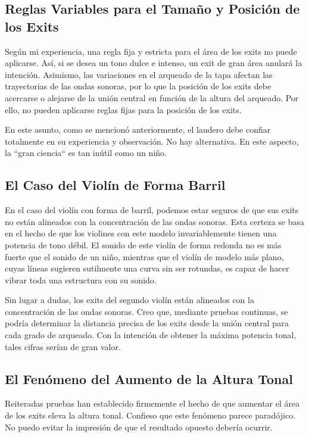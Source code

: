 \documentclass[12pt]{book}
\begin{document}
\subsection*{Reglas Variables para el Tamaño y Posición de los Exits}

Según mi experiencia, una regla fija y estricta para el área de los exits no puede aplicarse. Así, si se desea un tono dulce e intenso, un exit de gran área anulará la intención. Asimismo, las variaciones en el arqueado de la tapa afectan las trayectorias de las ondas sonoras, por lo que la posición de los exits debe acercarse o alejarse de la unión central en función de la altura del arqueado. Por ello, no pueden aplicarse reglas fijas para la posición de los exits.

En este asunto, como se mencionó anteriormente, el laudero debe confiar totalmente en su experiencia y observación. No hay alternativa. En este aspecto, la ``gran ciencia`` es tan inútil como un niño. 

\subsection*{El Caso del Violín de Forma Barril}

En el caso del violín con forma de barril, podemos estar seguros de que sus exits no están alineados con la concentración de las ondas sonoras. Esta certeza se basa en el hecho de que los violines con este modelo invariablemente tienen una potencia de tono débil. El sonido de este violín de forma redonda no es más fuerte que el sonido de un niño, mientras que el violín de modelo más plano, cuyas líneas sugieren sutilmente una curva sin ser rotundas, es capaz de hacer vibrar toda una estructura con su sonido.

Sin lugar a dudas, los exits del segundo violín están alineados con la concentración de las ondas sonoras. Creo que, mediante pruebas continuas, se podría determinar la distancia precisa de los exits desde la unión central para cada grado de arqueado. Con la intención de obtener la máxima potencia tonal, tales cifras serían de gran valor.

\subsection*{El Fenómeno del Aumento de la Altura Tonal}

Reiteradas pruebas han establecido firmemente el hecho de que aumentar el área de los exits eleva la altura tonal. Confieso que este fenómeno parece paradójico. No puedo evitar la impresión de que el resultado opuesto debería ocurrir.
\end{document}
